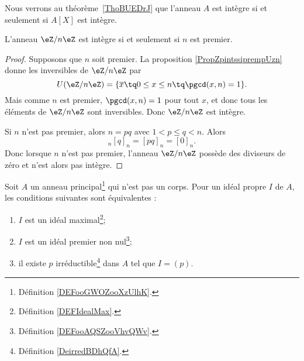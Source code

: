 Nous verrons au théorème~\ref{ThoBUEDrJ} que l'anneau \( A\) est intègre si et seulement si \( A[X]\) est intègre.

\begin{corollary}   \label{CorZnInternprem}
	L'anneau \( \eZ/n\eZ\) est intègre si et seulement si \( n\) est premier.
\end{corollary}

\begin{proof}
	Supposons que \( n\) soit premier. La proposition \ref{PropZpintssiprempUzn} donne les inversibles de \( \eZ/n\eZ\) par
	\begin{equation}
		U(\eZ/n\eZ)=\{ \overline x\tq 0\leq x\leq n\tq\pgcd(x,n)=1 \}.
	\end{equation}
	Mais comme \( n\) est premier, \( \pgcd(x,n)=1\) pour tout \( x\), et donc tous les éléments de \( \eZ/n\eZ\) sont inversibles. Donc \( \eZ/n\eZ\) est intègre.

	Si \( n\) n'est pas premier, alors \( n=pq\) avec \( 1<p\leq q<n\). Alors
	\begin{equation}
		[p]_n[q]_n=[pq]_n=[0]_n.
	\end{equation}
	Donc lorsque \( n\) n'est pas premier,  l'anneau \( \eZ/n\eZ\) possède des diviseurs de zéro et n'est alors pas intègre.
\end{proof}



\begin{proposition} \label{PropomqcGe}
	Soit \( A\) un anneau principal\footnote{Définition \ref{DEFooGWOZooXzUlhK}.} qui n'est pas un corps. Pour un idéal propre \( I\) de \( A\), les conditions suivantes sont équivalentes :
	\begin{enumerate}
		\item       \label{ITEMooNOVFooEHtcwE}
		      \( I\) est un idéal maximal\footnote{Définition \ref{DEFIdealMax}.};
		\item       \label{ITEMooMQWVooNocVEU}
		      \( I\) est un idéal premier non nul\footnote{Définition \ref{DEFooAQSZooVhvQWv}.};
		\item       \label{ITEMooJBXGooEISNuW}
		      il existe \( p\) irréductible\footnote{Définition \ref{DeirredBDhQfA}.} dans \( A\) tel que \( I=(p)\).
	\end{enumerate}
\end{proposition}

